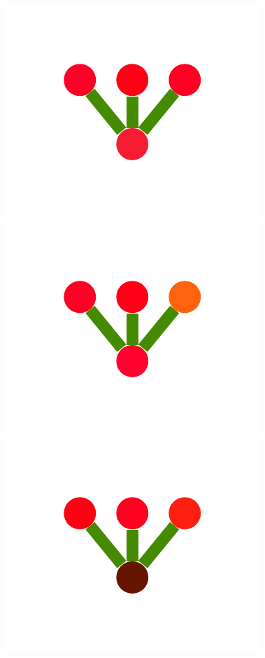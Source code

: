 \documentclass[a4paper,10pt]{article}
\begin{document}
\begin{figure}
{    \includegraphics[scale=.26]{../figures/vector/4-2-1-noisyprog-pre-3.pdf}
    \includegraphics[scale=.26]{../figures/vector/4-2-1-noisyprog-pre-4.pdf}
    \includegraphics[scale=.26]{../figures/vector/4-2-1-noisyprog-pre-5.pdf}
}
\end{figure}
\end{document}

